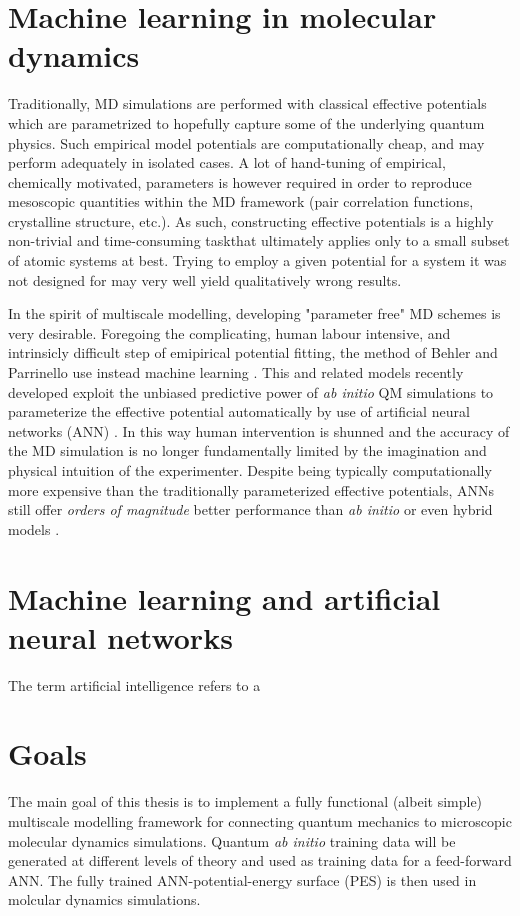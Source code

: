 \documentclass[twoside,english]{uiofysmaster}
\begin{document}
\section{Machine learning in molecular dynamics}
Traditionally, MD simulations are performed with classical effective potentials which are parametrized to hopefully capture some of the underlying quantum physics. Such empirical model potentials are computationally cheap, and may perform adequately in isolated cases. A lot of hand-tuning of empirical, chemically motivated, parameters is however required in order to reproduce mesoscopic quantities within the MD framework (pair correlation functions, crystalline structure, etc.). As such, constructing effective potentials is a highly non-trivial and time-consuming task\textemdash that ultimately applies only to a small subset of atomic systems at best. Trying to employ a given potential for a 
system it was not designed for may very well yield qualitatively wrong results. 

In the spirit of multiscale modelling, developing "parameter free" MD schemes is very desirable. Foregoing the complicating, human labour intensive, and intrinsicly difficult step of emipirical potential fitting, the method of Behler and Parrinello use instead machine learning \cite{behlerparrinello}. This and related models recently developed exploit the unbiased predictive power of \emph{ab initio} QM simulations to parameterize the effective potential automatically by use of artificial neural networks (ANN) \cite{shen}. In this way human intervention is  shunned and the accuracy of the MD simulation is no longer fundamentally limited by the imagination and physical intuition of the experimenter. Despite being typically computationally more expensive than the traditionally parameterized effective potentials, ANNs still offer \emph{orders of magnitude} better performance than \emph{ab initio} or even hybrid models \cite{ratcliff,behler}.

\section{Machine learning and artificial neural networks}
The term artificial intelligence refers to a 


\section{Goals}
The main goal of this thesis is to implement a fully functional (albeit simple) multiscale modelling framework for connecting quantum mechanics to microscopic molecular dynamics simulations. Quantum \emph{ab initio} training data will be generated at different levels of theory and used as training data for a feed-forward ANN. The fully trained ANN-potential-energy surface (PES) is then used in molcular dynamics simulations. 
\end{document}
